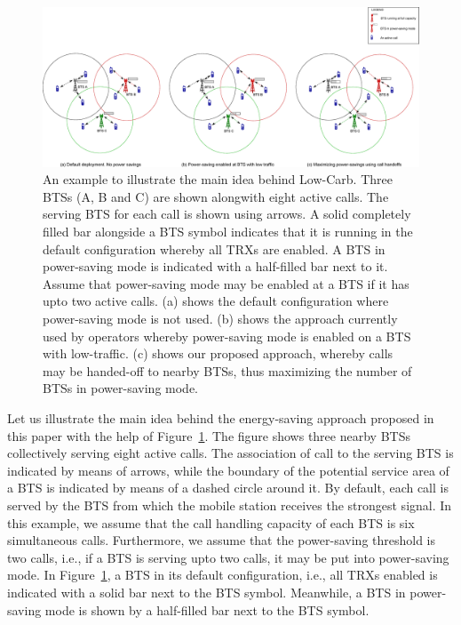 \begin{figure}
\includegraphics[width=1\textwidth]{figures/illustrationall.eps}
\caption{An example to illustrate the main idea behind Low-Carb. Three BTSs (A, B and C) are shown alongwith eight active calls. The serving BTS for each call is shown using arrows. A solid completely filled bar alongside a BTS symbol indicates that it is running in the default configuration whereby all TRXs are enabled. A BTS in power-saving mode is indicated with a half-filled bar next to it. Assume that power-saving mode may be enabled at a BTS if it has upto two active calls. (a) shows the default configuration where power-saving mode is not used. (b) shows the approach currently used by operators whereby power-saving mode is enabled on a BTS with low-traffic. (c) shows our proposed approach, whereby calls may be handed-off to nearby BTSs, thus maximizing the number of BTSs in power-saving mode.}
\label{fig:illustrationall}
\end{figure}


Let us illustrate the main idea behind the energy-saving approach proposed in this paper with the help of Figure~\ref{fig:illustrationall}. The figure shows three nearby BTSs collectively serving eight active calls. The association of call to the serving BTS is indicated by means of arrows, while the boundary of the potential service area of a BTS is indicated by means of a dashed circle around it. By default, each call is served by the BTS from which the mobile station receives the strongest signal. In this example, we assume that the call handling capacity of each BTS is six simultaneous calls. Furthermore, we assume that the power-saving threshold is two calls, i.e., if a BTS is serving upto two calls, it may be put into power-saving mode. In Figure~\ref{fig:illustrationall}, a BTS in its default configuration, i.e., all TRXs enabled is indicated with a solid bar next to the BTS symbol. Meanwhile, a BTS in power-saving mode is shown by a half-filled bar next to the BTS symbol.



